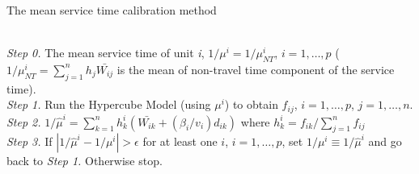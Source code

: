 \begin{frame}{}{}
  {\footnotesize
  \begin{center}
    The mean service time calibration method
  \end{center}
  \vspace{-8pt}
  \hline \\
  \vspace{2pt}
  \textit{Step 0.} The mean service time of unit \textit{i},
  $1/\mu^{i}=1/\mu_{NT}^{i}$, $i = 1,\ldots,p$ 
  ($1/\mu_{NT}^{i} = \sum_{j=1}^{n}{h_j\bar{W_{ij}}}$ 
  is the mean of non-travel time component of the service time). \\
  \textit{Step 1.} Run the Hypercube Model (using $\mu^i$) to obtain $f_{ij}$, $i = 1,\ldots,p$, $j = 1,\ldots,n$. \\
  \textit{Step 2.} $1/\hat{\mu}^{i} = \sum_{k=1}^{n}{h_{k}^{i}(\bar{W_{ik}}+(\beta_{i}/v_{i})d_{ik})}$ where $h_{k}^{i} = f_{ik}/\sum_{j=1}^{n}{f_{ij}}$ \\
  \textit{Step 3.} If $|1/\hat{\mu}^{i}-1/\mu^{i}|>\epsilon$ for at least one $i$, $i=1,\ldots,p$, set $1/\mu^{i} \equiv 1/\hat{\mu}^{i}$ and go back to \textit{Step 1.} Otherwise stop. \\
  \hline
}
\end{frame}
